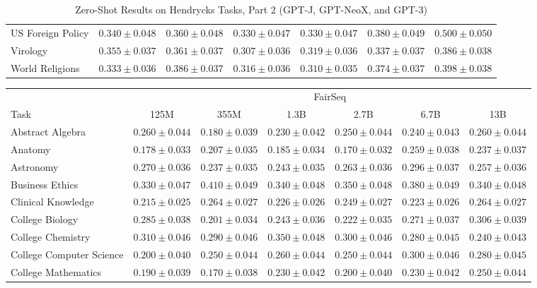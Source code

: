\documentclass[11pt]{article}
\begin{document}
{\begin{landscape}
\begin{table}
\begin{tabular}{l c c c c c c }
US Foreign Policy & $0.340 \pm 0.048$ & $0.360 \pm 0.048$ & $0.330 \pm 0.047$ & $0.330 \pm 0.047$ & $0.380 \pm 0.049$ & $0.500 \pm 0.050$ \\ 
Virology & $0.355 \pm 0.037$ & $0.361 \pm 0.037$ & $0.307 \pm 0.036$ & $0.319 \pm 0.036$ & $0.337 \pm 0.037$ & $0.386 \pm 0.038$ \\ 
World Religions & $0.333 \pm 0.036$ & $0.386 \pm 0.037$ & $0.316 \pm 0.036$ & $0.310 \pm 0.035$ & $0.374 \pm 0.037$ & $0.398 \pm 0.038$ \\  \bottomrule
\end{tabular}
\caption{Zero-Shot Results on Hendrycks Tasks, Part 2 (GPT-J, GPT-NeoX, and GPT-3)}
\label{tab:hendrycks-gpt2}
\end{table}

\begin{table}    
\centering 
\begin{tabular}{l c c c c c c }
 & \multicolumn{6}{c}{FairSeq} \\
Task & 125M & 355M & 1.3B & 2.7B & 6.7B & 13B\\ \toprule
Abstract Algebra & $0.260 \pm 0.044$ & $0.180 \pm 0.039$ & $0.230 \pm 0.042$ & $0.250 \pm 0.044$ & $0.240 \pm 0.043$ & $0.260 \pm 0.044$ \\ 
Anatomy & $0.178 \pm 0.033$ & $0.207 \pm 0.035$ & $0.185 \pm 0.034$ & $0.170 \pm 0.032$ & $0.259 \pm 0.038$ & $0.237 \pm 0.037$ \\ 
Astronomy & $0.270 \pm 0.036$ & $0.237 \pm 0.035$ & $0.243 \pm 0.035$ & $0.263 \pm 0.036$ & $0.296 \pm 0.037$ & $0.257 \pm 0.036$ \\ 
Business Ethics & $0.330 \pm 0.047$ & $0.410 \pm 0.049$ & $0.340 \pm 0.048$ & $0.350 \pm 0.048$ & $0.380 \pm 0.049$ & $0.340 \pm 0.048$ \\ 
Clinical Knowledge & $0.215 \pm 0.025$ & $0.264 \pm 0.027$ & $0.226 \pm 0.026$ & $0.249 \pm 0.027$ & $0.223 \pm 0.026$ & $0.264 \pm 0.027$ \\ 
College Biology & $0.285 \pm 0.038$ & $0.201 \pm 0.034$ & $0.243 \pm 0.036$ & $0.222 \pm 0.035$ & $0.271 \pm 0.037$ & $0.306 \pm 0.039$ \\ 
College Chemistry & $0.310 \pm 0.046$ & $0.290 \pm 0.046$ & $0.350 \pm 0.048$ & $0.300 \pm 0.046$ & $0.280 \pm 0.045$ & $0.240 \pm 0.043$ \\ 
College Computer Science & $0.200 \pm 0.040$ & $0.250 \pm 0.044$ & $0.260 \pm 0.044$ & $0.250 \pm 0.044$ & $0.300 \pm 0.046$ & $0.280 \pm 0.045$ \\ 
College Mathematics & $0.190 \pm 0.039$ & $0.170 \pm 0.038$ & $0.230 \pm 0.042$ & $0.200 \pm 0.040$ & $0.230 \pm 0.042$ & $0.250 \pm 0.044$ \\ 

\end{tabular}
\end{table}
\end{landscape}}
\end{document}
